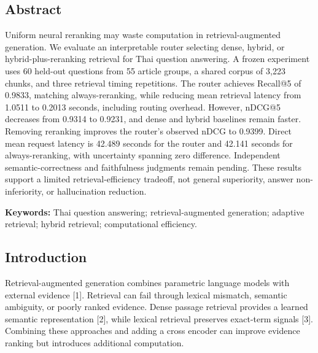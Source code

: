 \documentclass[10pt,a4paper]{article}
\begin{document}
\hypertarget{abstract}{%
\subsection{Abstract}\label{abstract}}

Uniform neural reranking may waste computation in retrieval-augmented
generation. We evaluate an interpretable router selecting dense, hybrid,
or hybrid-plus-reranking retrieval for Thai question answering. A frozen
experiment uses 60 held-out questions from 55 article groups, a shared
corpus of 3,223 chunks, and three retrieval timing repetitions. The
router achieves Recall@5 of 0.9833, matching always-reranking, while
reducing mean retrieval latency from 1.0511 to 0.2013 seconds, including
routing overhead. However, nDCG@5 decreases from 0.9314 to 0.9231, and
dense and hybrid baselines remain faster. Removing reranking improves
the router's observed nDCG to 0.9399. Direct mean request latency is
42.489 seconds for the router and 42.141 seconds for always-reranking,
with uncertainty spanning zero difference. Independent
semantic-correctness and faithfulness judgments remain pending. These
results support a limited retrieval-efficiency tradeoff, not general
superiority, answer non-inferiority, or hallucination reduction.

\textbf{Keywords:} Thai question answering; retrieval-augmented
generation; adaptive retrieval; hybrid retrieval; computational
efficiency.

\hypertarget{introduction}{%
\subsection{Introduction}\label{introduction}}

Retrieval-augmented generation combines parametric language models with
external evidence [1]. Retrieval can fail through lexical
mismatch, semantic ambiguity, or poorly ranked evidence. Dense passage
retrieval provides a learned semantic representation [2], while
lexical retrieval preserves exact-term signals [3]. Combining
these approaches and adding a cross encoder can improve evidence ranking
but introduces additional computation.
\end{document}
